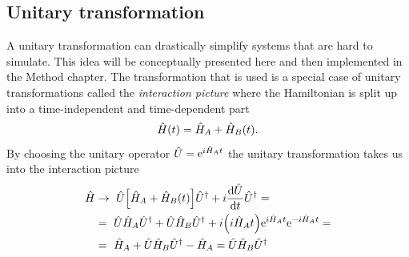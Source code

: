 \documentclass[main.tex]{subfiles}
\begin{document}
\subsection{Unitary transformation}
A unitary transformation can drastically simplify systems that are hard to simulate.
This idea will be conceptually presented here and then implemented in the Method chapter.
The transformation that is used is a special case of unitary transformations called the \emph{interaction picture} where the Hamiltonian is split up into a time-independent and time-dependent part
\begin{equation}
    \hat{H}(t) = \hat{H}_A + \hat{H}_B(t).
\end{equation}
By choosing the unitary operator \( \hat{U} = \mathrm{e}^{i \hat{H}_A t} \) the unitary transformation takes us into the interaction picture
\begin{align*}
    \hat{H} &\rightarrow~ \hat{U}\qty[ \hat{H}_A  + \hat{H}_B(t)]\hat{U}^\dagger + i\dv{\hat{U}}{t}\hat{U}^\dagger =\\
    &=~ \hat{U}\hat{H}_A\hat{U}^\dagger + \hat{U}\hat{H}_B\hat{U}^\dagger + i\qty(i\hat{H}_A t)\mathrm{e}^{i \hat{H}_A t}\mathrm{e}^{-i\hat{H}_A t}=\\
    &=~ \hat{H}_A + \hat{U}\hat{H}_B\hat{U}^\dagger - \hat{H}_A = \hat{U}\hat{H}_B\hat{U}^\dagger
\end{align*}
\end{document}
